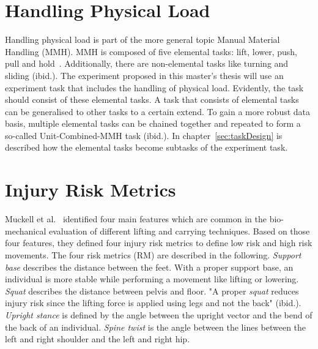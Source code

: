 \section{Handling Physical Load}
\label{section:handlingphysicalload}
Handling physical load is part of the more general topic Manual Material Handling (MMH). MMH is composed of five elemental tasks: lift, lower, push, pull and hold~\cite{mmh}. Additionally, there are non-elemental tasks like turning and sliding (ibid.). The experiment proposed in this master's thesis will use an experiment task that includes the handling of physical load. Evidently, the task should consist of these elemental tasks. A task that consists of elemental tasks can be generalised to other tasks to a certain extend. To gain a more robust data basis, multiple elemental tasks can be chained together and repeated to form a so-called Unit-Combined-MMH task (ibid.). In chapter~\ref{sec:taskDesign} is described how the elemental tasks become subtasks of the experiment task.

\section{Injury Risk Metrics}
\label{section:rm}
Muckell et al.~\cite{muckell} identified four main features which are common in the bio-mechanical evaluation of different lifting and carrying techniques. Based on those four features, they defined four injury risk metrics to define low risk and high risk movements. The four risk metrics (RM) are described in the following. \textit{Support base} describes the distance between the feet. With a proper support base, an individual is more stable while performing a movement like lifting or lowering. \textit{Squat} describes the distance between pelvis and floor. "A proper \textit{squat} reduces injury risk since the lifting force is applied using legs and not the back" (ibid.). \textit{Upright stance} is defined by the angle between the upright vector and the bend of the back of an individual. \textit{Spine twist} is the angle between the lines between the left and right shoulder and the left and right hip.
\newpage

